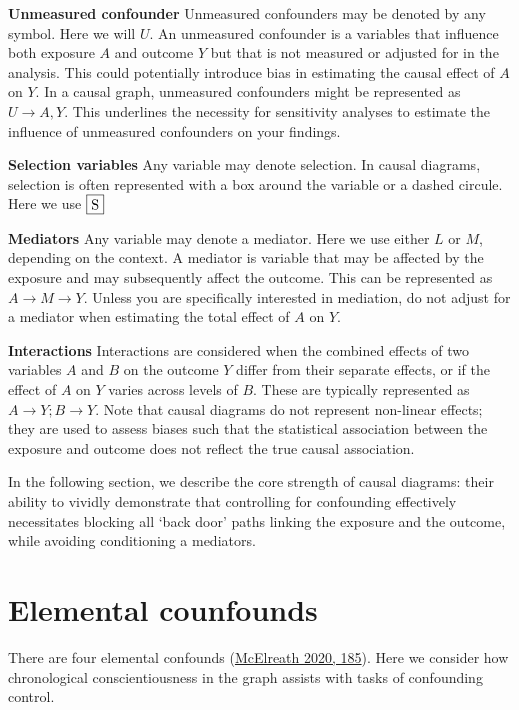 \documentclass[
  singlecolumn]{report}
\begin{document}
\textbf{Unmeasured confounder} Unmeasured confounders may be denoted by
any symbol. Here we will \(U\). An unmeasured confounder is a variables
that influence both exposure \(A\) and outcome \(Y\) but that is not
measured or adjusted for in the analysis. This could potentially
introduce bias in estimating the causal effect of \(A\) on \(Y\). In a
causal graph, unmeasured confounders might be represented as
\(U \to A, Y\). This underlines the necessity for sensitivity analyses
to estimate the influence of unmeasured confounders on your findings.

\textbf{Selection variables} Any variable may denote selection. In
causal diagrams, selection is often represented with a box around the
variable or a dashed circule. Here we use \(\framebox{S}\)

\textbf{Mediators} Any variable may denote a mediator. Here we use
either \(L\) or \(M\), depending on the context. A mediator is variable
that may be affected by the exposure and may subsequently affect the
outcome. This can be represented as \(A \to M \to Y\). Unless you are
specifically interested in mediation, do not adjust for a mediator when
estimating the total effect of \(A\) on \(Y\).

\textbf{Interactions} Interactions are considered when the combined
effects of two variables \(A\) and \(B\) on the outcome \(Y\) differ
from their separate effects, or if the effect of \(A\) on \(Y\) varies
across levels of \(B\). These are typically represented as
\(A \to Y; B \to Y\). Note that causal diagrams do not represent
non-linear effects; they are used to assess biases such that the
statistical association between the exposure and outcome does not
reflect the true causal association.

In the following section, we describe the core strength of causal
diagrams: their ability to vividly demonstrate that controlling for
confounding effectively necessitates blocking all `back door' paths
linking the exposure and the outcome, while avoiding conditioning a
mediators.

\hypertarget{elemental-counfounds}{%
\section{Elemental counfounds}\label{elemental-counfounds}}

There are four elemental confounds
(\protect\hyperlink{ref-mcelreath2020}{McElreath 2020, 185}). Here we
consider how chronological conscientiousness in the graph assists with
tasks of confounding control.
\end{document}
